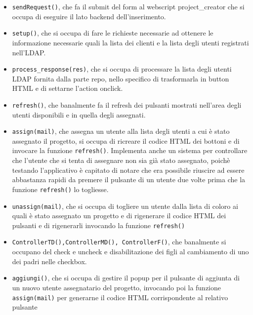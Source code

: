 \begin{itemize}
\item \texttt{sendRequest()}, che fa il submit del form al webscript project\_creator che si occupa di eseguire il lato backend dell’inserimento.
\item \texttt{setup()}, che si occupa di fare le richieste necessarie  ad ottenere le informazione necessarie quali la lista dei clienti e la lista degli utenti registrati nell’LDAP.
\item \texttt{process\_response(res)}, che si occupa di processare la lista degli utenti LDAP fornita dalla parte repo, nello specifico di trasformarla in button HTML e di settarne l’action onclick.
\item \texttt{refresh()}, che banalmente fa il refresh dei pulsanti mostrati nell’area degli utenti disponibili e in quella degli assegnati.
\item \texttt{assign(mail)}, che assegna un utente alla lista degli utenti a cui è stato assegnato il progetto, si occupa di ricreare il codice HTML dei bottoni e di invocare la funzione \texttt{refresh()}. Implementa anche un sistema per controllare che l’utente che si tenta di assegnare non sia già stato assegnato, poichè testando l’applicativo è capitato di notare che era possibile riuscire ad essere abbastanza rapidi da premere il pulsante di un utente due volte prima che la funzione \texttt{refresh()} lo togliesse.
\item \texttt{unassign(mail)}, che si occupa di togliere un utente dalla lista di coloro ai quali è stato assegnato un progetto e di rigenerare il codice HTML dei pulsanti e di rigenerarli invocando la funzione \texttt{refresh()}
\item \texttt{ControllerTD(),ControllerMD(), ControllerF()}, che banalmente si occupano del check e uncheck e disabilitazione dei figli al cambiamento di uno dei padri nelle checkbox.
\item \texttt{aggiungi()}, che si occupa di gestire il popup per il pulsante di aggiunta di un nuovo utente assegnatario del progetto, invocando poi la funzione \texttt{assign(mail)} per generarne il codice HTML corrispondente al relativo pulsante
\end{itemize}


